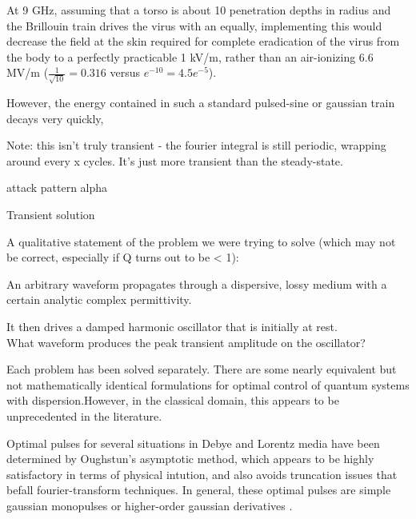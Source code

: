 \documentclass[paper.tex]{subfiles}
\begin{document}
At 9 GHz, assuming that a torso is about 10 penetration depths in radius and the Brillouin train 
drives the virus with an equally, implementing this would decrease the field at the skin required 
for complete eradication of the virus from the body to a perfectly practicable 1 kV/m, rather than 
an air-ionizing 6.6 MV/m ($\frac{1}{\sqrt{10}}=0.316$ versus $e^{-10}=4.5e^{-5}$). 

However, the energy contained in such a standard pulsed-sine or gaussian train decays very quickly, 







Note: this isn't truly transient - the fourier integral is still periodic, wrapping around every x cycles. It's just more transient than the steady-state.




attack pattern alpha


Transient solution

\pagebreak
A qualitative statement of the problem we were trying to solve (which may not be correct, especially if Q turns out to be < 1):

\begin{toolchain}
An arbitrary waveform propagates through a dispersive, lossy medium with a certain analytic complex 
permittivity. 

It then drives a damped harmonic oscillator that is initially at rest.\\

What waveform produces the peak transient amplitude on the oscillator?
\end{toolchain}


Each problem has been solved separately. There are some nearly equivalent but not mathematically identical formulations for optimal control of quantum systems with dispersion.\footnotemark However, in the classical domain, this appears to be unprecedented in the literature.




Optimal pulses for several situations in Debye and Lorentz media have been determined by Oughstun's asymptotic method, which appears to be highly satisfactory in terms of physical intution, and also avoids truncation issues that befall fourier-transform techniques. In general, these optimal pulses are simple gaussian monopulses or higher-order gaussian derivatives \cite{Optimal2017} \cite{Optimal2015}. 
\end{document}
